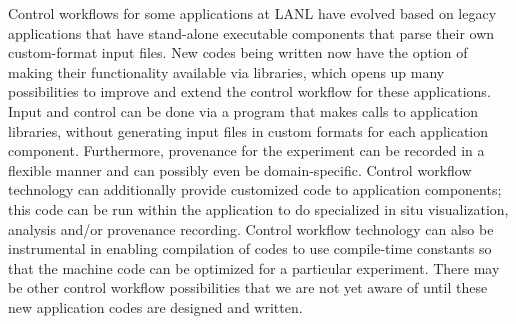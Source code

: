 Control workflows for some applications at LANL have evolved based on legacy applications that have stand-alone executable components that parse their own custom-format input files.  New codes being written now have the option of making their functionality available via libraries, which opens up many possibilities to improve and extend the control workflow for these applications.  Input and control can be done via a program that makes calls to application libraries, without generating input files in custom formats for each application component.  Furthermore, provenance for the experiment can be recorded in a flexible manner and can possibly even be domain-specific.  Control workflow technology can additionally provide customized code to application components; this code can be run within the application to do specialized in situ visualization, analysis and/or provenance recording.  Control workflow technology can also be instrumental in enabling compilation of codes to use compile-time constants so that the machine code can be optimized for a particular experiment.   There may be other control workflow possibilities that we are not yet aware of until these new application codes are designed and written.  



